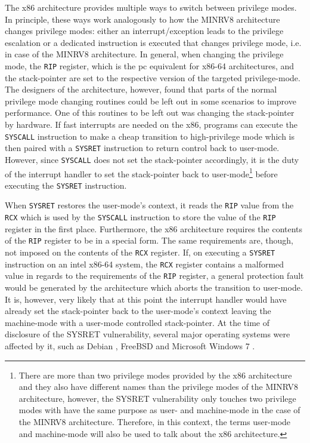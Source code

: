 The x86 architecture provides multiple ways to switch between privilege modes.
In principle, these ways work analogously to how the MINRV8 architecture changes privilege modes: either an interrupt/exception leads to the privilege escalation or a dedicated instruction is executed that changes privilege mode, i.e.  in case of the MINRV8 architecture.
In general, when changing the privilege mode, the \lstinline{RIP} register, which is the \gls{pc} equivalent for x86-64 architectures, and the stack-pointer are set to the respective version of the targeted privilege-mode.
The designers of the architecture, however, found that parts of the normal privilege mode changing routines could be left out in some scenarios to improve performance.
One of this routines to be left out was changing the stack-pointer by hardware.
If fast interrupts are needed on the x86, programs can execute the \lstinline{SYSCALL} instruction to make a cheap transition to high-privilege mode which is then paired with a \lstinline{SYSRET} instruction to return control back to user-mode.
However, since \lstinline{SYSCALL} does not set the stack-pointer accordingly, it is the duty of the interrupt handler to set the stack-pointer back to user-mode\footnote{%
    There are more than two privilege modes provided by the x86 architecture and they also have different names than the privilege modes of the MINRV8 architecture, however, the SYSRET vulnerability only touches two privilege modes with have the same purpose as user- and machine-mode in the case of the MINRV8 architecture.
    Therefore, in this context, the terms user-mode and machine-mode will also be used to talk about the x86 architecture.
} before executing the \lstinline{SYSRET} instruction.

When \lstinline{SYSRET} restores the user-mode's context, it reads the \lstinline{RIP} value from the \lstinline{RCX} which is used by the \lstinline{SYSCALL} instruction to store the value of the \lstinline{RIP} register in the first place.
Furthermore, the x86 architecture requires the contents of the \lstinline{RIP} register to be in a special form.
The same requirements are, though, not imposed on the contents of the \lstinline{RCX} register.
If, on executing a \lstinline{SYSRET} instruction on an intel x86-64 system, the \lstinline{RCX} register contains a malformed value in regards to the requirements of the \lstinline{RIP} register, a general protection fault would be generated by the architecture which aborts the transition to user-mode.
It is, however, very likely that at this point the interrupt handler would have already set the stack-pointer back to the user-mode's context leaving the machine-mode with a user-mode controlled stack-pointer.
At the time of disclosure of the SYSRET vulnerability, several major operating systems were affected by it, such as Debian \cite{SYSRETDebian}, FreeBSD \cite{SYSRETFreeBSD} and Microsoft Windows 7 \cite{SYSRETMicrosoft}.

